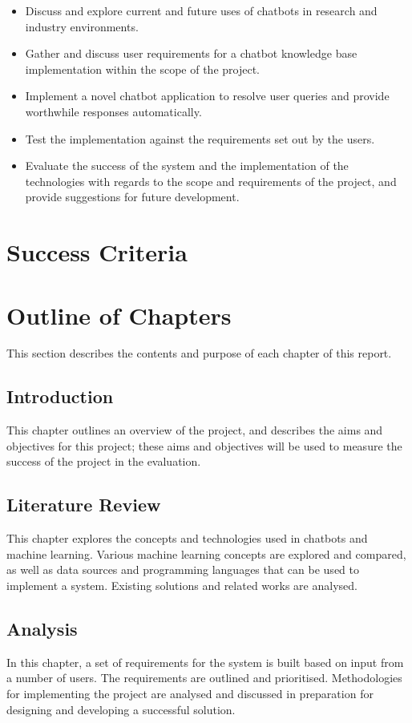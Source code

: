 \begin{itemize}
	\itemsep0em 
	\item Discuss and explore current and future uses of chatbots in research and industry environments.
	\item Gather and discuss user requirements for a chatbot knowledge base implementation within the scope of the project.
	\item Implement a novel chatbot application to resolve user queries and provide worthwhile responses automatically.
	\item Test the implementation against the requirements set out by the users.
	\item Evaluate the success of the system and the implementation of the technologies with regards to the scope and requirements of the project, and provide suggestions for future development.

\end{itemize}

\section{Success Criteria}

\newpage
\section{Outline of Chapters}
This section describes the contents and purpose of each chapter of this report.

\subsection*{Introduction}
This chapter outlines an overview of the project, and describes the aims and objectives for this project; these aims and objectives will be used to measure the success of the project in the evaluation.

\subsection*{Literature Review}
This chapter explores the concepts and technologies used in chatbots and machine learning. Various machine learning concepts are explored and compared, as well as data sources and programming languages that can be used to implement a system. Existing solutions and related works are analysed.

\subsection*{Analysis}
In this chapter, a set of requirements for the system is built based on input from a number of users. The requirements are outlined and prioritised. Methodologies for implementing the project are analysed and discussed in preparation for designing and developing a successful solution.

